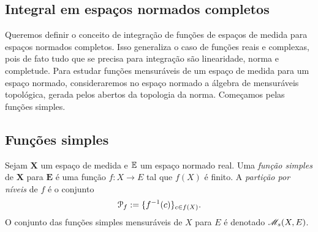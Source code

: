 \subsection{Integral em espaços normados completos}

Queremos definir o conceito de integração de funções de espaços de medida para espaços normados completos. Isso generaliza o caso de funções reais e complexas, pois de fato tudo que se precisa para integração são linearidade, norma e completude. Para estudar funções mensuráveis de um espaço de medida para um espaço normado, consideraremos no espaço normado a álgebra de mensuráveis topológica, gerada pelos abertos da topologia da norma. Começamos pelas funções simples.

\subsection{Funções simples}

\begin{definition}
Sejam $\bm X$ um espaço de medida e $\mathbb{E}$ um espaço normado real. Uma \emph{função simples} de $\bm X$ para $\bm E$ é uma função $f\colon X \to E$ tal que $f(X)$ é finito. A \emph{partição por níveis} de $f$ é o conjunto
	\begin{equation*}
	\mathcal P_f := \{f^{-1}(c)\}_{c \in f(X)}.
	\end{equation*}
O conjunto das funções simples mensuráveis de $X$ para $E$ é denotado $\mathscr{M}_s(X,E)$.
\end{definition}

